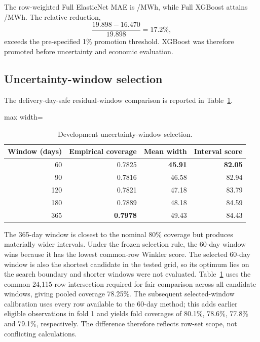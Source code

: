 The row-weighted Full ElasticNet MAE is /MWh, while Full XGBoost attains /MWh. The relative reduction,
\[
\frac{19.898-16.470}{19.898}=17.2\%,
\]
exceeds the pre-specified 1\% promotion threshold. XGBoost was therefore promoted before uncertainty and economic evaluation.

\subsection{Uncertainty-window selection}

The delivery-day-safe residual-window comparison is reported in Table~\ref{tab:uncertainty_windows}.

\begin{table}[htbp]
\centering
\caption{Development uncertainty-window selection.}
\label{tab:uncertainty_windows}
\begin{adjustbox}{max width=\textwidth}
\begin{tabular}{rrrr}
\toprule
Window (days) & Empirical coverage & Mean width & Interval score \\
\midrule
60 & 0.7825 & \textbf{45.91} & \textbf{82.05} \\
90 & 0.7816 & 46.58 & 82.94 \\
120 & 0.7821 & 47.18 & 83.79 \\
180 & 0.7889 & 48.18 & 84.59 \\
365 & \textbf{0.7978} & 49.43 & 84.43 \\
\bottomrule
\end{tabular}
\end{adjustbox}
\end{table}

The 365-day window is closest to the nominal 80\% coverage but produces materially wider intervals. Under the frozen selection rule, the 60-day window wins because it has the lowest common-row Winkler score. The selected 60-day window is also the shortest candidate in the tested grid, so its optimum lies on the search boundary and shorter windows were not evaluated. Table~\ref{tab:uncertainty_windows} uses the common 24,115-row intersection required for fair comparison across all candidate windows, giving pooled coverage 78.25\%. The subsequent selected-window calibration uses every row available to the 60-day method; this adds earlier eligible observations in fold 1 and yields fold coverages of 80.1\%, 78.6\%, 77.8\% and 79.1\%, respectively. The difference therefore reflects row-set scope, not conflicting calculations.

